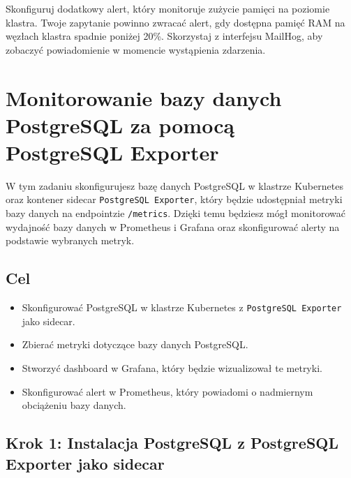\documentclass{article}
\begin{document}
Skonfiguruj dodatkowy alert, który monitoruje zużycie pamięci na poziomie klastra. Twoje zapytanie powinno zwracać alert, gdy dostępna pamięć RAM na węzłach klastra spadnie poniżej 20\%. Skorzystaj z interfejsu MailHog, aby zobaczyć powiadomienie w momencie wystąpienia zdarzenia.

\section{Monitorowanie bazy danych PostgreSQL za pomocą PostgreSQL Exporter}

W tym zadaniu skonfigurujesz bazę danych PostgreSQL w klastrze Kubernetes oraz kontener sidecar \texttt{PostgreSQL Exporter}, który będzie udostępniał metryki bazy danych na endpointzie \texttt{/metrics}. Dzięki temu będziesz mógł monitorować wydajność bazy danych w Prometheus i Grafana oraz skonfigurować alerty na podstawie wybranych metryk.

\subsection{Cel}
\begin{itemize}
    \item Skonfigurować PostgreSQL w klastrze Kubernetes z \texttt{PostgreSQL Exporter} jako sidecar.
    \item Zbierać metryki dotyczące bazy danych PostgreSQL.
    \item Stworzyć dashboard w Grafana, który będzie wizualizował te metryki.
    \item Skonfigurować alert w Prometheus, który powiadomi o nadmiernym obciążeniu bazy danych.
\end{itemize}

\subsection{Krok 1: Instalacja PostgreSQL z PostgreSQL Exporter jako sidecar}
\end{document}
